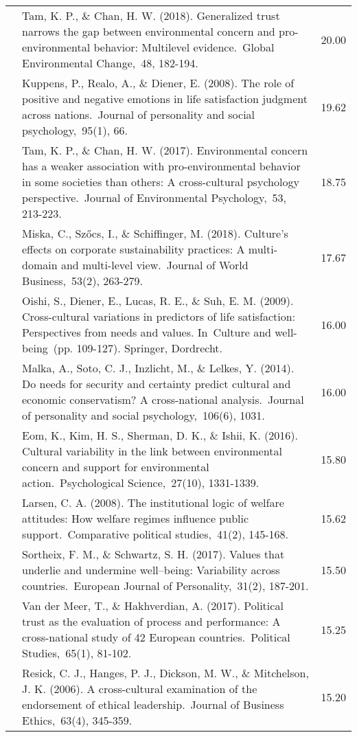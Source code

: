 \documentclass[
  man,floatsintext]{apa6}
\begin{document}
\begin{center}
\begin{ThreePartTable}
{\begin{longtable}{m{2cm}m{11cm}m{2cm}}
 & Tam, K. P., \& Chan, H. W. (2018). Generalized trust narrows the gap between environmental concern and pro-environmental behavior: Multilevel evidence. Global Environmental Change, 48, 182-194. & 20.00\\
 & Kuppens, P., Realo, A., \& Diener, E. (2008). The role of positive and negative emotions in life satisfaction judgment across nations. Journal of personality and social psychology, 95(1), 66. & 19.62\\
 & Tam, K. P., \& Chan, H. W. (2017). Environmental concern has a weaker association with pro-environmental behavior in some societies than others: A cross-cultural psychology perspective. Journal of Environmental Psychology, 53, 213-223. & 18.75\\
 & Miska, C., Szőcs, I., \& Schiffinger, M. (2018). Culture’s effects on corporate sustainability practices: A multi-domain and multi-level view. Journal of World Business, 53(2), 263-279. & 17.67\\
 & Oishi, S., Diener, E., Lucas, R. E., \& Suh, E. M. (2009). Cross-cultural variations in predictors of life satisfaction: Perspectives from needs and values. In Culture and well-being (pp. 109-127). Springer, Dordrecht. & 16.00\\
 & Malka, A., Soto, C. J., Inzlicht, M., \& Lelkes, Y. (2014). Do needs for security and certainty predict cultural and economic conservatism? A cross-national analysis. Journal of personality and social psychology, 106(6), 1031. & 16.00\\
 & Eom, K., Kim, H. S., Sherman, D. K., \& Ishii, K. (2016). Cultural variability in the link between environmental concern and support for environmental action. Psychological Science, 27(10), 1331-1339. & 15.80\\
 & Larsen, C. A. (2008). The institutional logic of welfare attitudes: How welfare regimes influence public support. Comparative political studies, 41(2), 145-168. & 15.62\\
 & Sortheix, F. M., \& Schwartz, S. H. (2017). Values that underlie and undermine well–being: Variability across countries. European Journal of Personality, 31(2), 187-201. & 15.50\\
 & Van der Meer, T., \& Hakhverdian, A. (2017). Political trust as the evaluation of process and performance: A cross-national study of 42 European countries. Political Studies, 65(1), 81-102. & 15.25\\
 & Resick, C. J., Hanges, P. J., Dickson, M. W., \& Mitchelson, J. K. (2006). A cross-cultural examination of the endorsement of ethical leadership. Journal of Business Ethics, 63(4), 345-359. & 15.20\\

\end{longtable}}
\end{ThreePartTable}
\end{center}
\end{document}
